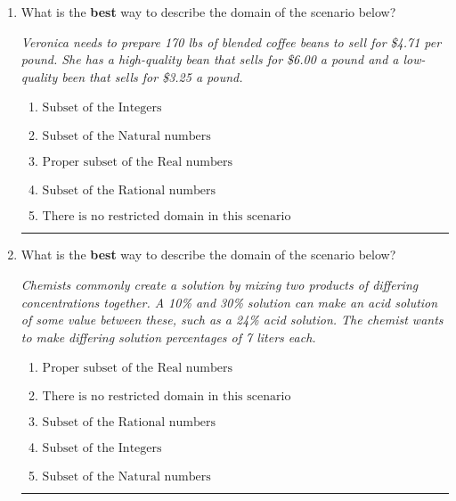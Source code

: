 \documentclass[14pt]{extbook}
\newcommand{\litem}[1]{\item#1\hspace*{-1cm}\rule{\textwidth}{0.4pt}}
\begin{document}
\begin{enumerate}
{\begin{enumerate}[label=\Alph*.]
\end{enumerate} }
\litem{
What is the \textbf{best} way to describe the domain of the scenario below?
\begin{center}
    \textit{ Veronica needs to prepare 170 lbs of blended coffee beans to sell for \$4.71 per pound. She has a high-quality bean that sells for \$6.00 a pound and a low-quality been that sells for \$3.25 a pound. }
\end{center}
\begin{enumerate}[label=\Alph*.]
\item \( \text{Subset of the Integers} \)
\item \( \text{Subset of the Natural numbers} \)
\item \( \text{Proper subset of the Real numbers} \)
\item \( \text{Subset of the Rational numbers} \)
\item \( \text{There is no restricted domain in this scenario} \)

\end{enumerate} }
\litem{
What is the \textbf{best} way to describe the domain of the scenario below?
\begin{center}
    \textit{ Chemists commonly create a solution by mixing two products of differing concentrations together. A 10\% and 30\% solution can make an acid solution of some value between these, such as a 24\% acid solution. The chemist wants to make differing solution percentages of 7 liters each. }
\end{center}
\begin{enumerate}[label=\Alph*.]
\item \( \text{Proper subset of the Real numbers} \)
\item \( \text{There is no restricted domain in this scenario} \)
\item \( \text{Subset of the Rational numbers} \)
\item \( \text{Subset of the Integers} \)
\item \( \text{Subset of the Natural numbers} \)


\end{enumerate}}
\end{enumerate}
\end{document}
